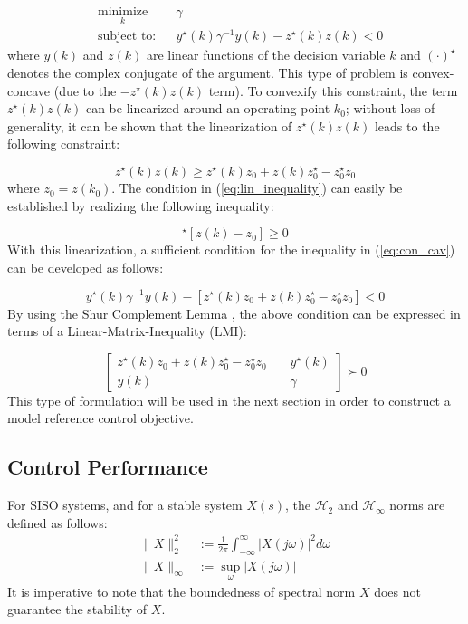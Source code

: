 \documentclass[a4paper, 10pt, conference]{ieeeconf}
\begin{document}
\begin{equation} \label{eq:con_cav}
\begin{aligned}
& \underset{ k }{\text{minimize}}
& & \gamma  \\
& \text{subject to:} & & y^{\star}(k) \gamma^{-1} y(k) - z^{\star}(k)z(k) < 0 
\end{aligned}
\end{equation}
where $y(k)$ and $z(k)$ are linear functions of the decision variable $k$ and $(\cdot)^{\star}$ denotes the complex conjugate of the argument. This type of problem is convex-concave (due to the $-z^{\star}(k)z(k)$ term). To convexify this constraint, the term $z^{\star}(k)z(k)$ can be linearized around an operating point $k_0$; without loss of generality, it can be shown that the linearization of $z^{\star}(k)z(k)$ leads to the following constraint:

\begin{equation} \label{eq:lin_inequality}
z^{\star}(k)z(k) \geq z^{\star}(k)z_0 + z(k)z_0^{\star} - z_0^{\star}z_0
\end{equation} 
where $z_0 = z(k_0)$. The condition in (\ref{eq:lin_inequality}) can easily be established by realizing the following inequality:

\begin{equation}
[z(k)-z_0]^{\star}[z(k)-z_0] \geq 0
\end{equation}
With this linearization, a sufficient condition for the inequality in (\ref{eq:con_cav}) can be developed as follows:

\begin{equation}
y^{\star}(k) \gamma^{-1} y(k) - [z^{\star}(k)z_0 + z(k)z_0^{\star} - z_0^{\star}z_0]< 0 
\end{equation}
By using the Shur Complement Lemma \cite{BEN09}, the above condition can be expressed in terms of a Linear-Matrix-Inequality (LMI):

\begin{equation} \label{eq:LMI_1}
\begin{bmatrix}
z^{\star}(k)z_0 + z(k)z_0^{\star} - z_0^{\star}z_0 & \phantom{kk} y^{\star}(k) \\
y(k) & \phantom{kk} \gamma
\end{bmatrix}
\succ 0
\end{equation}
This type of formulation will be used in the next section in order to construct a model reference control objective. 

\subsection{Control Performance}  \label{sec:controlperformance}
For SISO systems, and for a stable system $X(s)$, the $\mathcal{H}_2$ and $\mathcal{H}_\infty$ norms are defined as follows:
\begin{align*}
\| X\|_2^2 & := \frac{1}{2\pi} \int_{- \infty}^\infty |X(j\omega)|^2 d\omega \\
\| X\|_\infty & :=  \sup_{\omega} |X(j\omega)|
\end{align*}
It is imperative to note that the boundedness of spectral norm $X$ does not guarantee the stability of $X$. 
\end{document}
